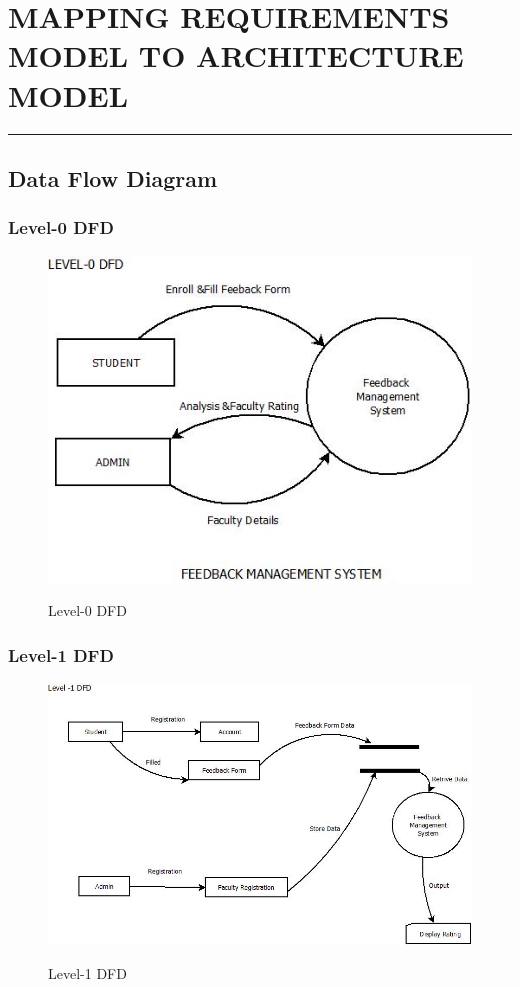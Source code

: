 \documentclass[12 pt,a4paper]{report}
\begin{document}
\chapter{MAPPING REQUIREMENTS MODEL TO ARCHITECTURE MODEL}
\rule{\textwidth}{2 pt}
\section{Data Flow Diagram}
\subsection{Level-0 DFD }
\begin{figure}[ht]
\begin{center}
\includegraphics[scale=.6]{L-0.png}\\
\caption{Level-0 DFD}
\end{center}
\end{figure}
\subsection{Level-1 DFD }
\begin{figure}[ht]
\begin{center} 
\includegraphics[scale=.4]{L-1.png}\\
\caption{Level-1 DFD}
\end{center}
\end{figure}
\end{document}
